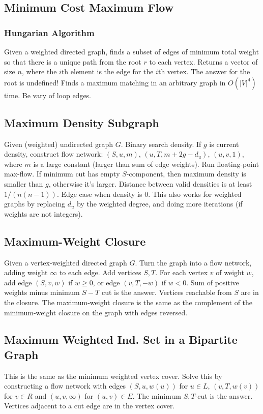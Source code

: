   \subsection{Minimum Cost Maximum Flow}
    \subsubsection{Hungarian Algorithm}
    Given a weighted directed graph, finds a subset of edges of minimum
    total weight so that there is a unique path from the root $r$ to each
    vertex. Returns a vector of size $n$, where the $i$th element is the
    edge for the $i$th vertex. The answer for the root is undefined!
    Finds a maximum matching in an arbitrary graph in $O(|V|^4)$ time. Be
    vary of loop edges.
  \subsection{Maximum Density Subgraph}
    Given (weighted) undirected graph $G$. Binary search density. If $g$ is
    current density, construct flow network: $(S, u, m)$, $(u, T,
    m+2g-d_u)$, $(u,v,1)$, where $m$ is a large constant (larger than sum
    of edge weights). Run floating-point max-flow. If minimum cut has empty
    $S$-component, then maximum density is smaller than $g$, otherwise it's
    larger. Distance between valid densities is at least $1/(n(n-1))$. Edge
    case when density is $0$. This also works for weighted graphs by
    replacing $d_u$ by the weighted degree, and doing more iterations (if
    weights are not integers).
  \subsection{Maximum-Weight Closure}
    Given a vertex-weighted directed graph $G$. Turn the graph into a flow
    network, adding weight $\infty$ to each edge. Add vertices $S,T$. For
    each vertex $v$ of weight $w$, add edge $(S,v,w)$ if $w\geq 0$, or edge
    $(v,T,-w)$ if $w<0$. Sum of positive weights minus minimum $S-T$ cut is
    the answer. Vertices reachable from $S$ are in the closure. The
    maximum-weight closure is the same as the complement of the
    minimum-weight closure on the graph with edges reversed.
  \subsection{Maximum Weighted Ind. Set in a Bipartite Graph}
    This is the same as the minimum weighted vertex cover. Solve this by
    constructing a flow network with edges $(S,u,w(u))$ for $u\in L$,
    $(v,T,w(v))$ for $v\in R$ and $(u,v,\infty)$ for $(u,v)\in E$. The
    minimum $S,T$-cut is the answer. Vertices adjacent to a cut edge are
    in the vertex cover.
